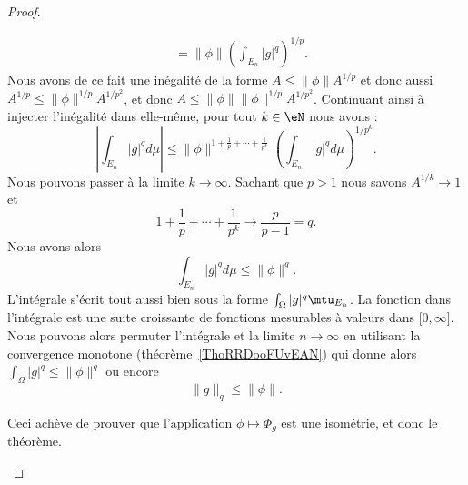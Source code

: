 \begin{proof}
\begin{subproof}
\begin{subequations}
\begin{align}
                                               & =\| \phi \|\left( \int_{E_n}| g |^q \right)^{1/p}.
        \end{align}
    \end{subequations}
    Nous avons de ce fait une inégalité de la forme \( A\leq \| \phi \|A^{1/p}\) et donc aussi \( A^{1/p}\leq \| \phi \|^{1/p}A^{1/p^2}\), et donc \( A\leq \| \phi \|\| \phi \|^{1/p}A^{1/p^2}\). Continuant ainsi à injecter l'inégalité dans elle-même, pour tout \( k\in \eN\) nous avons :
    \begin{equation}
        \left| \int_{E_n}| g |^qd\mu \right| \leq\| \phi \|^{1+\frac{1}{ p }+\cdots+\frac{1}{ p^k }}\left( \int_{E_n}| g |^qd\mu \right)^{1/p^k}.
    \end{equation}
    Nous pouvons passer à la limite \( k\to \infty\). Sachant que \( p>1\) nous savons \( A^{1/k}\to 1\) et
    \begin{equation}
        1+\frac{1}{ p }+\cdots+\frac{1}{ p^k }\to\frac{ p }{ p-1 }=q.
    \end{equation}
    Nous avons alors
    \begin{equation}
        \int_{E_n}| g |^qd\mu\leq \| \phi \|^q.
    \end{equation}
    L'intégrale s'écrit tout aussi bien sous la forme \( \int_{\Omega}| g  |^q\mtu_{E_n}\). La fonction dans l'intégrale est une suite croissante de fonctions mesurables à valeurs dans \( \mathopen[ 0 , \infty \mathclose]\). Nous pouvons alors permuter l'intégrale et la limite \( n\to \infty\) en utilisant la convergence monotone (théorème~\ref{ThoRRDooFUvEAN}) qui donne alors \( \int_{\Omega}| g |^q\leq \| \phi \|^q\) ou encore
    \begin{equation}
        \| g \|_q\leq \| \phi \|.
    \end{equation}

    Ceci achève de prouver que l'application \( \phi\mapsto \Phi_g\) est une isométrie, et donc le théorème.
\end{subproof}
\end{proof}

